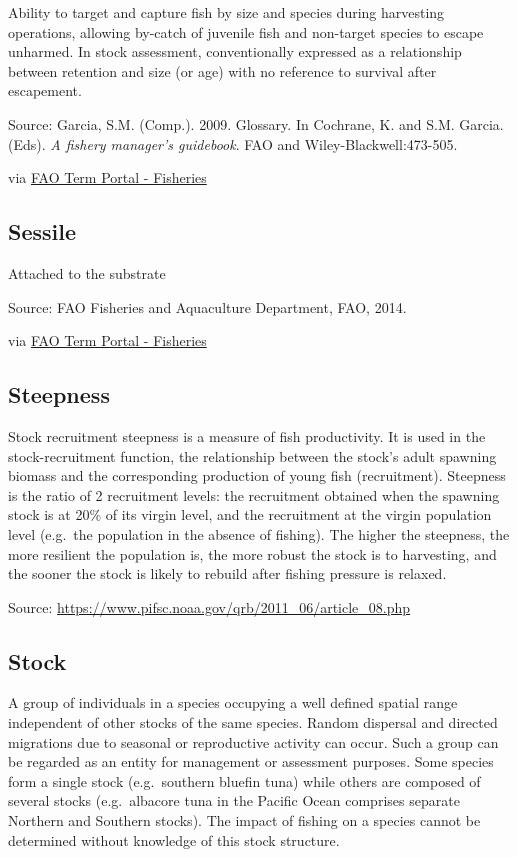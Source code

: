 \documentclass[
  11pt,
]{book}
\begin{document}
Ability to target and capture fish by size and species during harvesting operations, allowing by-catch of juvenile fish and non-target species to escape unharmed. In stock assessment, conventionally expressed as a relationship between retention and size (or age) with no reference to survival after escapement.

Source: Garcia, S.M. (Comp.). 2009. Glossary. In Cochrane, K. and S.M. Garcia. (Eds). \emph{A fishery manager's guidebook}. FAO and Wiley-Blackwell:473-505.

via \href{http://www.fao.org/fishery/glossary/en}{FAO Term Portal - Fisheries}

\hypertarget{sessile}{%
\subsection{Sessile}\label{sessile}}

Attached to the substrate

Source: FAO Fisheries and Aquaculture Department, FAO, 2014.

via \href{http://www.fao.org/fishery/glossary/en}{FAO Term Portal - Fisheries}

\hypertarget{steepness}{%
\subsection{Steepness}\label{steepness}}

Stock recruitment steepness is a measure of fish productivity. It is used in the stock-recruitment function, the relationship between the stock's adult spawning biomass and the corresponding production of young fish (recruitment). Steepness is the ratio of 2 recruitment levels: the recruitment obtained when the spawning stock is at 20\% of its virgin level, and the recruitment at the virgin population level (e.g.~the population in the absence of fishing). The higher the steepness, the more resilient the population is, the more robust the stock is to harvesting, and the sooner the stock is likely to rebuild after fishing pressure is relaxed.

Source: \url{https://www.pifsc.noaa.gov/qrb/2011_06/article_08.php}

\hypertarget{stock}{%
\subsection{Stock}\label{stock}}

A group of individuals in a species occupying a well defined spatial range independent of other stocks of the same species. Random dispersal and directed migrations due to seasonal or reproductive activity can occur. Such a group can be regarded as an entity for management or assessment purposes. Some species form a single stock (e.g.~southern bluefin tuna) while others are composed of several stocks (e.g.~albacore tuna in the Pacific Ocean comprises separate Northern and Southern stocks). The impact of fishing on a species cannot be determined without knowledge of this stock structure.
\end{document}
